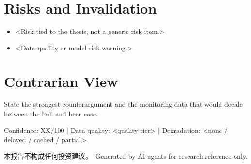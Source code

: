 \documentclass[a4paper,11pt,fontset=none]{ctexart}
\newcommand{\reportdisclaimer}{本报告不构成任何投资建议。}
\begin{document}
\section{Risks and Invalidation}

\begin{riskbox}[Risks]
\begin{itemize}
  \item <Risk tied to the thesis, not a generic risk item.>
  \item <Data-quality or model-risk warning.>
\end{itemize}
\end{riskbox}

\section{Contrarian View}

State the strongest counterargument and the monitoring data that would decide between the bull and bear case.

\vfill
\begin{disclosurebox}[Metadata]
\footnotesize
Confidence: XX/100 \quad | \quad
Data quality: <quality tier> \quad | \quad
Degradation: <none / delayed / cached / partial>

\vspace{0.4em}
{\tiny\reportdisclaimer\ Generated by AI agents for research reference only.}
\end{disclosurebox}
\end{document}
